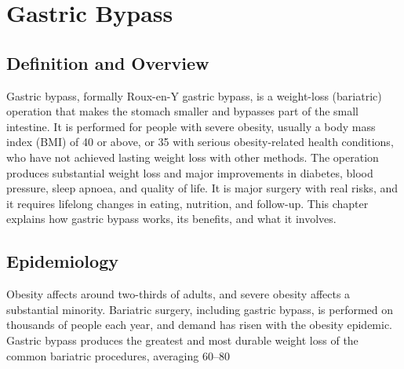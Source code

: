 \chapter{Gastric Bypass}

\section*{Definition and Overview}
Gastric bypass, formally Roux-en-Y gastric bypass, is a weight-loss (bariatric) operation that makes the stomach smaller and bypasses part of the small intestine. It is performed for people with severe obesity, usually a body mass index (BMI) of 40 or above, or 35 with serious obesity-related health conditions, who have not achieved lasting weight loss with other methods. The operation produces substantial weight loss and major improvements in diabetes, blood pressure, sleep apnoea, and quality of life. It is major surgery with real risks, and it requires lifelong changes in eating, nutrition, and follow-up. This chapter explains how gastric bypass works, its benefits, and what it involves.

\section*{Epidemiology}
Obesity affects around two-thirds of adults, and severe obesity affects a substantial minority. Bariatric surgery, including gastric bypass, is performed on thousands of people each year, and demand has risen with the obesity epidemic. Gastric bypass produces the greatest and most durable weight loss of the common bariatric procedures, averaging 60--80%

